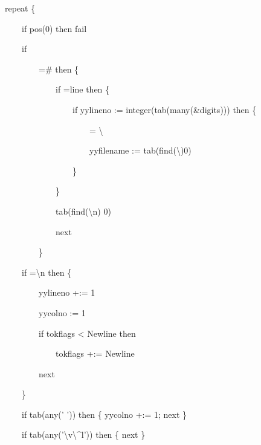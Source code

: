 \bigskip

{\ttfamily\mdseries
\ \ \ repeat \{}

{\ttfamily\mdseries
\ \ \ \ \ \ \ if pos(0) then fail}

{\ttfamily\mdseries
\ \ \ \ \ \ \ if }

{\ttfamily\mdseries
\ \ \ \ \ \ \ \ \ \ \ ={\textquotedbl}\#{\textquotedbl} then \{}

{\ttfamily\mdseries
\ \ \ \ \ \ \ \ \ \ \ \ \ \ \ if ={\textquotedbl}line {\textquotedbl} then \{}

{\ttfamily\mdseries
\ \ \ \ \ \ \ \ \ \ \ \ \ \ \ \ \ \ \ if yylineno := integer(tab(many(\&digits))) then \{}

{\ttfamily\mdseries
\ \ \ \ \ \ \ \ \ \ \ \ \ \ \ \ \ \ \ \ \ \ \ ={\textquotedbl} {\textbackslash}{\textquotedbl}{\textquotedbl}}

{\ttfamily\mdseries
\ \ \ \ \ \ \ \ \ \ \ \ \ \ \ \ \ \ \ \ \ \ \ yyfilename :=
tab(find({\textquotedbl}{\textbackslash}{\textquotedbl}{\textquotedbl}){\textbar}0)}

{\ttfamily\mdseries
\ \ \ \ \ \ \ \ \ \ \ \ \ \ \ \ \ \ \ \}}

{\ttfamily\mdseries
\ \ \ \ \ \ \ \ \ \ \ \ \ \ \ \}}

{\ttfamily\mdseries
\ \ \ \ \ \ \ \ \ \ \ \ \ \ \ tab(find({\textquotedbl}{\textbackslash}n{\textquotedbl}) {\textbar} 0)}

{\ttfamily\mdseries
\ \ \ \ \ \ \ \ \ \ \ \ \ \ \ next}

{\ttfamily\mdseries
\ \ \ \ \ \ \ \ \ \ \ \}}

{\ttfamily\mdseries
\ \ \ \ \ \ \ if ={\textquotedbl}{\textbackslash}n{\textquotedbl} then \{}

{\ttfamily\mdseries
\ \ \ \ \ \ \ \ \ \ \ yylineno +:= 1}

{\ttfamily\mdseries
\ \ \ \ \ \ \ \ \ \ \ yycolno := 1}

{\ttfamily\mdseries
\ \ \ \ \ \ \ \ \ \ \ if tokflags {\textless} Newline then}

{\ttfamily\mdseries
\ \ \ \ \ \ \ \ \ \ \ \ \ \ \ tokflags +:= Newline}

{\ttfamily\mdseries
\ \ \ \ \ \ \ \ \ \ \ next}

{\ttfamily\mdseries
\ \ \ \ \ \ \ \}}

{\ttfamily\mdseries
\ \ \ \ \ \ \ if tab(any(' ')) then \{ yycolno +:= 1; next \}}

{\ttfamily\mdseries
\ \ \ \ \ \ \ if tab(any('{\textbackslash}v{\textbackslash}\^{}l')) then \{ next \}}

